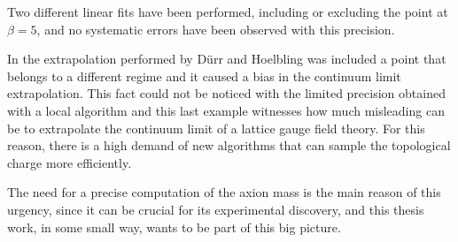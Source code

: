 Two different linear fits have been performed, including or excluding the point at $\beta=5$,
and no systematic errors have been observed with this precision.

In the extrapolation performed by D\"urr and Hoelbling was included a point that belongs to a different regime and it caused a bias in the continuum limit extrapolation.
This fact could not be noticed with the limited precision obtained with a local algorithm 
and this last example witnesses how much misleading can be to extrapolate the continuum limit of a lattice gauge field theory.
For this reason, there is a high demand of new algorithms that can sample the topological charge more efficiently.

The need for a precise computation of the axion mass is the main reason of this urgency,
since it can be crucial for its experimental discovery, and this thesis work,
in some small way, wants to be part of this big picture.

